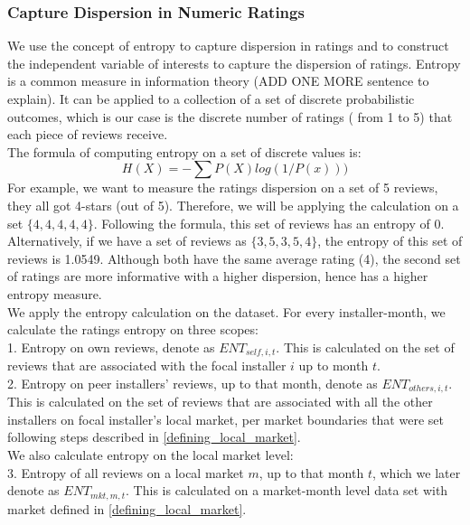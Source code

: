 \documentclass[msom,blindrev]{informs3}
\begin{document}
\subsubsection{Capture Dispersion in Numeric Ratings}
We use the concept of entropy to capture dispersion in ratings and to construct the independent variable of interests to capture the dispersion of ratings. Entropy is a common measure in information theory (ADD ONE MORE sentence to explain). It can be applied to a collection of a set of discrete probabilistic outcomes, which is our case is the discrete number of ratings ( from 1 to 5) that each piece of reviews receive. \\
The formula of computing entropy on a set of discrete values is:  \\
\begin{equation}
H(X)=-\sum P(X)log(1/P(x)))
\end{equation}
For example, we want to measure the ratings dispersion on a set of 5 reviews, they all got 4-stars (out of 5). Therefore, we will be applying the calculation on a set $\{4,4,4,4,4\}$. Following the formula, this set of reviews has an entropy of 0. Alternatively, if we have a set of reviews as $\{3,5,3,5,4\}$, the entropy of this set of reviews is 1.0549.  Although both have the same average rating (4), the second set of ratings are more informative with a higher dispersion, hence has a higher entropy measure. \\

We apply the entropy calculation on the dataset. For every installer-month, we calculate the ratings entropy on three scopes: \\
1. Entropy on own reviews, denote as $ENT_{self,i,t}$. This is calculated on the set of reviews that are associated with the focal installer $i$ up to month $t$.  \\
2. Entropy on peer installers' reviews, up to that month, denote as $ENT_{others,i,t}$. This is calculated on the set of reviews that are associated with all the other installers on focal installer's local market, per market boundaries that were set following steps described in \ref{defining_local_market}.  \\
We also calculate entropy on the local market level:\\
3. Entropy of all reviews on a local market $m$, up to that month $t$, which we later denote as $ENT_{mkt,m,t}$. This is calculated on a market-month level data set with market defined in \ref{defining_local_market}. \\
\end{document}
